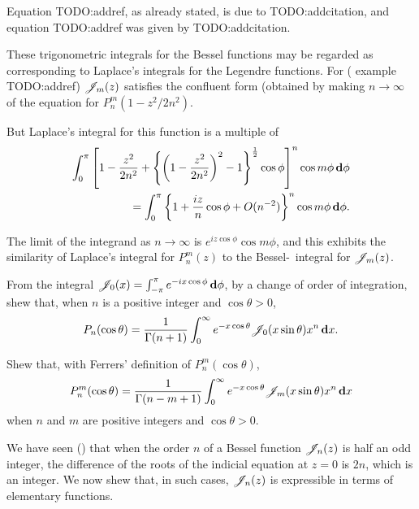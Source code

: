 % 
% 
Equation TODO:addref, as already stated, is due to TODO:addcitation,
and equation TODO:addref was given by TODO:addcitation.

These trigonometric integrals for the Bessel functions may be regarded
as corresponding to Laplace's integrals for the Legendre functions.
For ( example TODO:addref)
$\mathscr{J}_{m}(z)$ satisfies the confluent form (obtained by making 
$n \rightarrow \infty$ of the equation for
$P_{n}^{m}(1-z^{2}/2n^{2})$.

But Laplace's integral for this function is a multiple of 
\begin{align*}
\int_{0}^{\pi}
\left[ 
  1
  -
  \frac{z^{2}}{2n^{2}}
  +
  \left\{ 
    \left( 
      1 - \frac{z^{2}}{2n^{2}}
     \right)^{2}
    -
    1
   \right\}^{\frac{1}{2}}
  \cos \phi
 \right]^{n} \cos m\phi \, \mathbf{d} \phi
\\
=
\int_{0}^{\pi}
\left\{ 
  1
  + \frac{iz}{n} \cos\phi
  + O(n^{-2})
 \right\}^{n}
\cos m\phi \, \mathbf{d} \phi.
\end{align*}

The limit of the integrand as $n \rightarrow \infty$ is 
$e^{iz\cos\phi}\cos m\phi$, and this exhibits the similarity of
Laplace's integral for $P_{n}^{m}(z)$ to the Bessel-\Schlafli\ integral for 
$\mathscr{J}_{m}(z)$.
\begin{wandwexample}
  From the integral
  $\mathscr{J}_{0}(x) = \int_{-\pi}^{\pi} e^{-ix\cos\phi}\, \mathbf{d}\phi$, by a
  change of order of integration, shew that, when $n$ is a positive
  integer and $\cos\theta > 0$,
  $$
  P_{n}(\cos\theta)
  =
  \frac{1}{\Gamma(n+1)}
  \int_{0}^{\infty}
  e^{-x\cos\theta}
  \mathscr{J}_{0}(x\sin\theta)
  x^{n}
  \, \mathbf{d} x.
  $$
\end{wandwexample}
\begin{wandwexample}
  Shew that, with Ferrers' definition of $P_{n}^{m}(\cos\theta)$,
  $$
  P_{n}^{m}(\cos\theta)
  =
  \frac{1}{\Gamma(n-m+1)}
  \int_{0}^{\infty}
  e^{-x\cos\theta}
  \mathscr{J}_{m}(x\sin\theta)
  x^{n}
  \, \mathbf{d} x
  $$
  when $n$ and $m$ are positive integers and
  $\cos\theta > 0$.
\end{wandwexample}
We have seen () that when the order $n$ of a
Bessel function $\mathscr{J}_{n}(z)$ is half an odd integer, the difference of the
roots of the indicial equation at $z=0$ is $2n$, which is an integer.
We now shew that, in such cases, $\mathscr{J}_{n}(z)$ is expressible in terms of
elementary functions.

